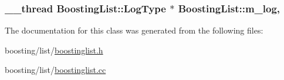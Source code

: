 \hypertarget{classBoostingList_a53dd78138a275866cd2586ed933af9d4}{
\subsubsection[{m\-\_\-log}]{\setlength{\rightskip}{0pt plus 5cm}\-\_\-\-\_\-thread {\bf Boosting\-List\-::\-Log\-Type} $\ast$ Boosting\-List\-::m\-\_\-log\hspace{0.3cm}{\ttfamily [static]}, {\ttfamily [private]}}}\label{classBoostingList_a53dd78138a275866cd2586ed933af9d4}


The documentation for this class was generated from the following files\-:\begin{DoxyCompactItemize}
\item 
boosting/list/\hyperlink{boostinglist_8h}{boostinglist.\-h}\item 
boosting/list/\hyperlink{boostinglist_8cc}{boostinglist.\-cc}\end{DoxyCompactItemize}
